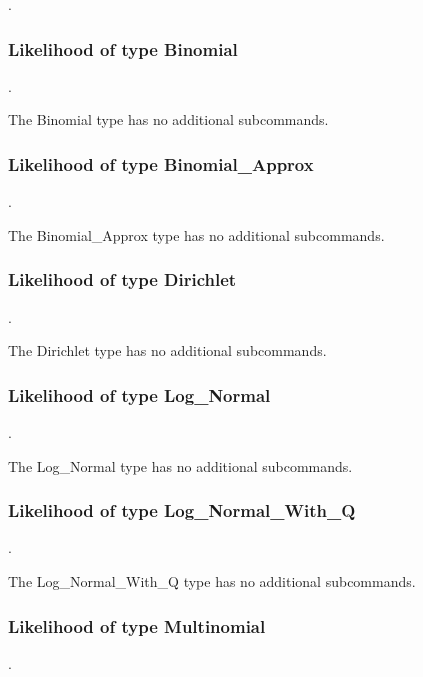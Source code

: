 .
\label{syntax:Likelihood}

\subsubsection{Likelihood of type Binomial}
.
\label{syntax:Likelihood-Binomial}

The Binomial type has no additional subcommands.
\subsubsection{Likelihood of type Binomial\_Approx}
.
\label{syntax:Likelihood-BinomialApprox}

The Binomial\_Approx type has no additional subcommands.
\subsubsection{Likelihood of type Dirichlet}
.
\label{syntax:Likelihood-Dirichlet}

The Dirichlet type has no additional subcommands.
\subsubsection{Likelihood of type Log\_Normal}
.
\label{syntax:Likelihood-LogNormal}

The Log\_Normal type has no additional subcommands.
\subsubsection{Likelihood of type Log\_Normal\_With\_Q}
.
\label{syntax:Likelihood-LogNormalWithQ}

The Log\_Normal\_With\_Q type has no additional subcommands.
\subsubsection{Likelihood of type Multinomial}
.
\label{syntax:Likelihood-Multinomial}

